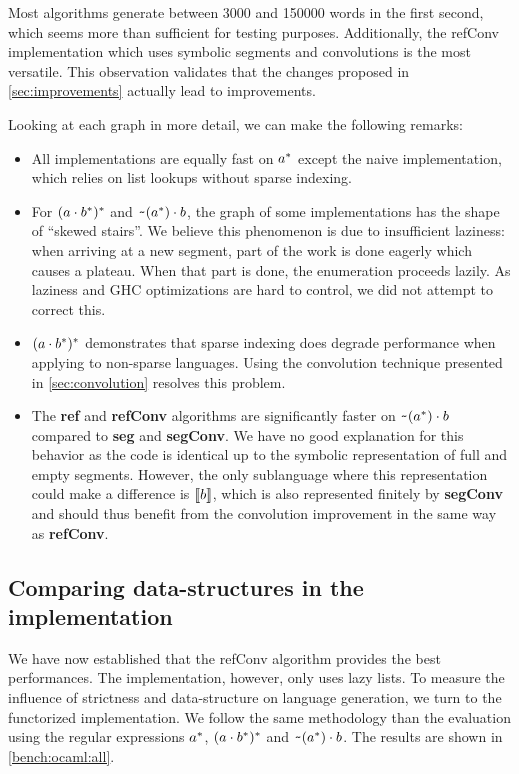 Most algorithms generate between 3000 and
150000 words in the first second, which seems more than sufficient for
testing purposes.  Additionally, the refConv implementation which uses
symbolic segments and convolutions is the most versatile. This observation
validates that the changes proposed in \cref{sec:improvements} actually lead to improvements.

Looking at each graph in more detail, we can make the following
remarks:
\begin{itemize}[leftmargin=*]
\item All implementations are equally fast on $a^*$ except
  the naive implementation, which  relies on list lookups without
  sparse indexing.
\item For $(a \cdot{b^*})^*$ and
  $\texttt{\textasciitilde}{(a^*)} \cdot{b}$, the graph of some implementations
  has the shape of ``skewed stairs''. We believe this phenomenon is due to
  insufficient laziness: when arriving at a new segment, part of the
  work is done eagerly which causes a plateau. When that part is done,
  the enumeration proceeds lazily.  As laziness and GHC
  optimizations are hard to control, we did not attempt to correct this.
\item $(a \cdot{b^*})^*$ demonstrates that sparse indexing
  does degrade performance when applying  to non-sparse languages.
  Using the convolution technique presented in \cref{sec:convolution} resolves this problem.
\item The \textbf{ref} and \textbf{refConv} algorithms are
  significantly faster on $\texttt{\textasciitilde}{(a^*)} \cdot{b}$
  compared to \textbf{seg} and \textbf{segConv}. We have no good
  explanation for this behavior as the code is identical up to the
  symbolic representation of full and empty segments. However, the
  only sublanguage where this representation could make a difference
  is $\llbracket b\rrbracket$, which is also represented finitely by
  \textbf{segConv} and should thus benefit from the convolution
  improvement in the same way as \textbf{refConv}.
\end{itemize}


\subsection{Comparing data-structures in the \ocaml implementation}
\label{sec:bench:ocaml}

We have now established that the refConv algorithm provides the best performances.
The \haskell implementation, however, only uses lazy lists. To measure
the influence of strictness and data-structure on language generation,
we turn to the functorized \ocaml implementation.
We follow the same methodology than the \haskell evaluation using
the regular expressions
$a^*$, $(a \cdot{b^*})^*$ and
$\texttt{\textasciitilde}{(a^*)} \cdot{b}$.
The results are shown in \cref{bench:ocaml:all}.

